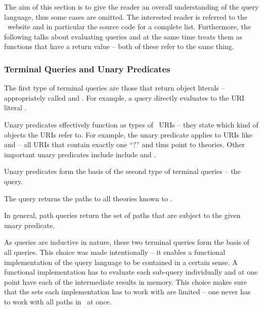 The aim of this section is to give the reader an overall understanding of the query language, thus some cases are omitted. 
The interested reader is referred to the \mmt\ website \cite{uniformal:on} and in particular the source code for a complete list. 
Furthermore, the following talks about evaluating queries and at the same time treats them as functions that have a return value -- both of these refer to the same thing.

\subsubsection*{Terminal Queries and Unary Predicates}\label{sec:qmt:terminal}

The first type of terminal queries are those that return object literals -- appropriately called  and .
For example, a query  directly evaluates to the URI literal .

Unary predicates effectively function as types of \mmt\ URIs -- they state which kind of objects the URIs refer to.
For example, the unary predicate  applies to URIs like  and  -- all URIs that contain exactly one ``?'' and thus point to theories.
Other important unary predicates include include  and .

Unary predicates form the basis of the second type of terminal queries -- the  query.
\begin{example}\label{example:paths}
	The query  returns the paths to all theories known to \mmt.
\end{example}
In general, path queries return the set of paths that are subject to the given unary predicate.

As queries are inductive in nature, these two terminal queries form the basis of all queries.
This choice was made intentionally -- it enables a functional implementation of the query language to be contained in a certain sense.
A functional implementation has to evaluate each sub-query individually and at one point have each of the intermediate results in memory. 
This choice makes sure that the sets each implementation has to work with are limited -- one never has to work with all paths in \mmt\ at once.

